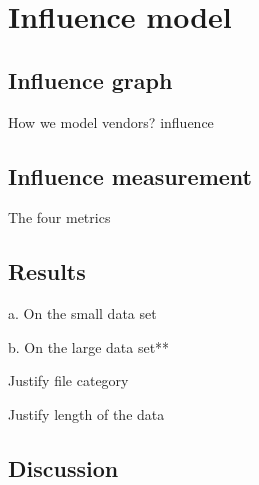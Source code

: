 \section{Influence model}

\subsection{Influence graph}

How we model vendors? influence

\subsection{Influence measurement}
The four metrics

\subsection{Results}

a. On the small data set

b. On the large data set**

Justify file category

Justify length of the data

\subsection{Discussion}
